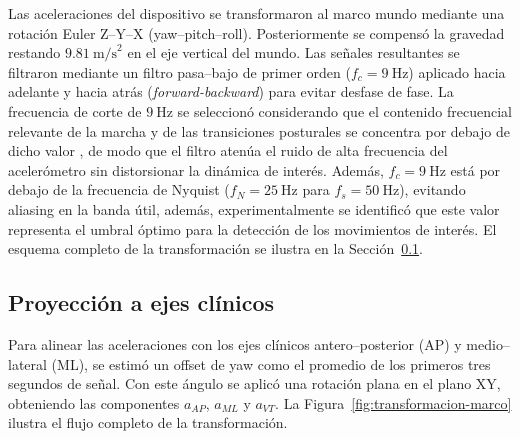 \documentclass[12pt]{report}
\begin{document}
\begin{justify}
    Las aceleraciones del dispositivo se transformaron al marco mundo mediante una rotación Euler Z–Y–X (yaw–pitch–roll). Posteriormente se compensó la gravedad restando $9.81~\text{m/s}^2$ en el eje vertical del mundo. Las señales resultantes se filtraron mediante un filtro pasa--bajo de primer orden ($f_c = 9~\text{Hz}$) aplicado hacia adelante y hacia atrás (\textit{forward-backward}) para evitar desfase de fase. La frecuencia de corte de $9~\text{Hz}$ se seleccionó considerando que el contenido frecuencial relevante de la marcha y de las transiciones posturales se concentra por debajo de dicho valor \cite{reliabilty-smartphone-kinematic}, de modo que el filtro atenúa el ruido de alta frecuencia del acelerómetro sin distorsionar la dinámica de interés. Además, $f_c = 9~\text{Hz}$ está por debajo de la frecuencia de Nyquist ($f_N = 25~\text{Hz}$ para $f_s = 50~\text{Hz}$), evitando aliasing en la banda útil, además, experimentalmente se identificó que este valor representa el umbral óptimo para la detección de los movimientos de interés. El esquema completo de la transformación se ilustra en la Sección~\ref{sec:proyeccion-ejes-clinicos}.

    \subsection{Proyección a ejes clínicos}
    \label{sec:proyeccion-ejes-clinicos}

    Para alinear las aceleraciones con los ejes clínicos antero--posterior (AP) y medio--lateral (ML), se estimó un offset de yaw como el promedio de los primeros tres segundos de señal. Con este ángulo se aplicó una rotación plana en el plano XY, obteniendo las componentes $a_{AP}$, $a_{ML}$ y $a_{VT}$. La Figura~\ref{fig:transformacion-marco} ilustra el flujo completo de la transformación.


\end{justify}
\end{document}
